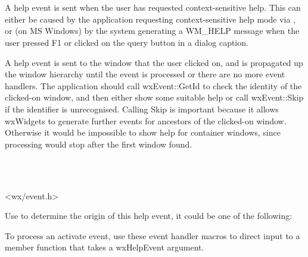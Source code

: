 \section{}\label{wxhelpevent}

A help event is sent when the user has requested context-sensitive help.
This can either be caused by the application requesting
context-sensitive help mode via , or
(on MS Windows) by the system generating a WM\_HELP message when the user pressed F1 or clicked
on the query button in a dialog caption.

A help event is sent to the window that the user clicked on, and is propagated up the
window hierarchy until the event is processed or there are no more event handlers.
The application should call wxEvent::GetId to check the identity of the clicked-on window,
and then either show some suitable help or call wxEvent::Skip if the identifier is unrecognised.
Calling Skip is important because it allows wxWidgets to generate further events for ancestors
of the clicked-on window. Otherwise it would be impossible to show help for container windows,
since processing would stop after the first window found.


\\
\\


<wx/event.h>

\label{wxhelpeventorigin}

Use  to determine the origin of this help event,
it could be one of the following:

\twocolwidtha{7cm}
\begin{twocollist}\itemsep=0pt
\end{twocollist}%


To process an activate event, use these event handler macros to direct input to a member
function that takes a wxHelpEvent argument.

